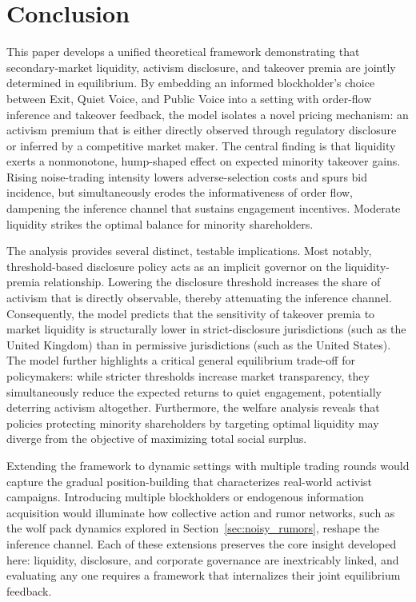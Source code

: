 \documentclass[11pt]{article}
\newcommand{\1}{\mathbf{1}}
\begin{document}
\section{Conclusion}
\label{sec:conclusion}

This paper develops a unified theoretical framework demonstrating that secondary-market liquidity, activism disclosure, and takeover premia are jointly determined in equilibrium. By embedding an informed blockholder's choice between Exit, Quiet Voice, and Public Voice into a setting with order-flow inference and takeover feedback, the model isolates a novel pricing mechanism: an activism premium that is either directly observed through regulatory disclosure or inferred by a competitive market maker. The central finding is that liquidity exerts a nonmonotone, hump-shaped effect on expected minority takeover gains. Rising noise-trading intensity lowers adverse-selection costs and spurs bid incidence, but simultaneously erodes the informativeness of order flow, dampening the inference channel that sustains engagement incentives. Moderate liquidity strikes the optimal balance for minority shareholders.

The analysis provides several distinct, testable implications. Most notably, threshold-based disclosure policy acts as an implicit governor on the liquidity-premia relationship. Lowering the disclosure threshold increases the share of activism that is directly observable, thereby attenuating the inference channel. Consequently, the model predicts that the sensitivity of takeover premia to market liquidity is structurally lower in strict-disclosure jurisdictions (such as the United Kingdom) than in permissive jurisdictions (such as the United States). The model further highlights a critical general equilibrium trade-off for policymakers: while stricter thresholds increase market transparency, they simultaneously reduce the expected returns to quiet engagement, potentially deterring activism altogether. Furthermore, the welfare analysis reveals that policies protecting minority shareholders by targeting optimal liquidity may diverge from the objective of maximizing total social surplus.

Extending the framework to dynamic settings with multiple trading rounds would capture the gradual position-building that characterizes real-world activist campaigns. Introducing multiple blockholders or endogenous information acquisition would illuminate how collective action and rumor networks, such as the wolf pack dynamics explored in Section~\ref{sec:noisy_rumors}, reshape the inference channel. Each of these extensions preserves the core insight developed here: liquidity, disclosure, and corporate governance are inextricably linked, and evaluating any one requires a framework that internalizes their joint equilibrium feedback.
\end{document}

